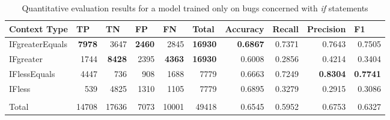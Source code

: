 \begin{appendices}
\begin{table*}[htbp]
\begin{tabular}{|l|r|r|r|r|r|r|r|r|r|}
\hline
\textbf{Context Type} & \multicolumn{1}{l|}{\textbf{TP}} & \multicolumn{1}{l|}{\textbf{TN}} & \multicolumn{1}{l|}{\textbf{FP}} & \multicolumn{1}{l|}{\textbf{FN}} & \multicolumn{1}{l|}{\textbf{Total}} & \multicolumn{1}{l|}{\textbf{Accuracy}} & \multicolumn{1}{l|}{\textbf{Recall}} & \multicolumn{1}{l|}{\textbf{Precision}} & \multicolumn{1}{l|}{\textbf{F1}} \\ \hline
IFgreaterEquals & \textbf{7978} & 3647 & \textbf{2460} & 2845 & \textbf{16930} & \textbf{0.6867} & 0.7371 & 0.7643 & 0.7505 \\ \hline
IFgreater & 1744 & \textbf{8428} & 2395 & \textbf{4363} & \textbf{16930} & 0.6008 & 0.2856 & 0.4214 & 0.3404 \\ \hline
IFlessEquals & 4447 & 736 & 908 & 1688 & 7779 & 0.6663 & 0.7249 & \textbf{0.8304} & \textbf{0.7741} \\ \hline
IFless & 539 & 4825 & 1310 & 1105 & 7779 & 0.6895 & 0.3279 & 0.2915 & 0.3086 \\ \hline
 & \multicolumn{1}{l|}{} & \multicolumn{1}{l|}{} & \multicolumn{1}{l|}{} & \multicolumn{1}{l|}{} & \multicolumn{1}{l|}{} & \multicolumn{1}{l|}{} & \multicolumn{1}{l|}{} & \multicolumn{1}{l|}{} & \multicolumn{1}{l|}{} \\ \hline
Total & 14708 & 17636 & 7073 & 10001 & 49418 & 0.6545 & 0.5952 & 0.6753 & 0.6327 \\ \hline
\end{tabular}
\caption{Quantitative evaluation results for a model trained only on bugs concerned with \textit{if} statements}
\label{tab:quantitative_if_evaluation}
\end{table*}



\end{appendices}
